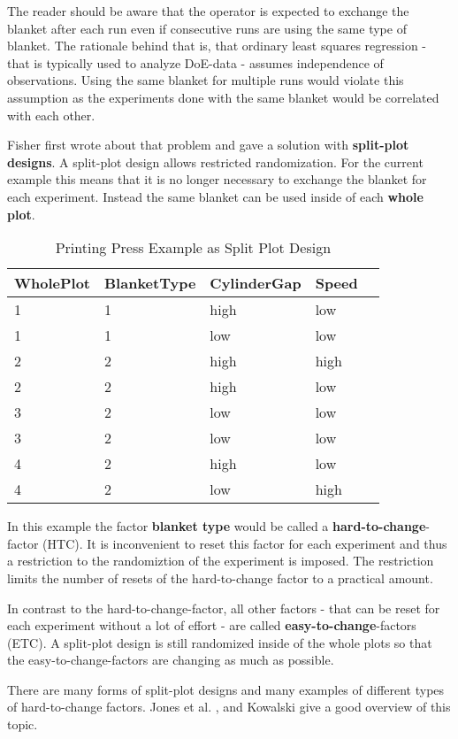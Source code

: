 The reader should be aware that the operator is expected to exchange the blanket after each run even if consecutive runs are using the same type of blanket. The rationale behind that is, that ordinary least squares regression - that is typically used to analyze DoE-data - assumes independence of observations. Using the same blanket for multiple runs would violate this assumption as the experiments done with the same blanket would be correlated with each other.

Fisher \cite{Fisher1992} first wrote about that problem and gave a solution with \textbf{split-plot designs}. A split-plot design allows restricted randomization. For the current example this means that it is no longer necessary to exchange the blanket for each experiment. Instead the same blanket can be used inside of each \textbf{whole plot}. 

\begin{table}[!h]
\centering
\begin{tabular}{lllll}
  \hline
 WholePlot & BlanketType& CylinderGap & Speed \\ 
  \hline
  1 & 1 &high & low \\ 
  1 & 1 & low & low \\ 
  2 & 2 & high & high \\ 
  2 & 2 & high & low \\ 
  3 & 2 & low & low \\ 
  3 & 2 & low & low \\ 
  4 & 2 & high & low \\ 
  4 & 2 & low & high \\ 
   \hline
\end{tabular}
	\caption{Printing Press Example as Split Plot Design}
\end{table}

In this example the factor \textbf{blanket type} would be called a \textbf{hard-to-change}-factor (HTC). It is inconvenient to reset this factor for each experiment and thus a restriction to the randomiztion of the experiment is imposed. The restriction limits the number of resets of the hard-to-change factor to a practical amount. 

In contrast to the hard-to-change-factor, all other factors - that can be reset for each experiment without a lot of effort - are called \textbf{easy-to-change}-factors (ETC). A split-plot design is still randomized inside of the whole plots so that the easy-to-change-factors are changing as much as possible. 

There are many forms of split-plot designs and many examples of different types of hard-to-change factors. Jones et al. \cite{jones:whyandhow}, \cite{jones:book} and Kowalski \cite{kowalski:recsplitplot} give a good overview of this topic.

